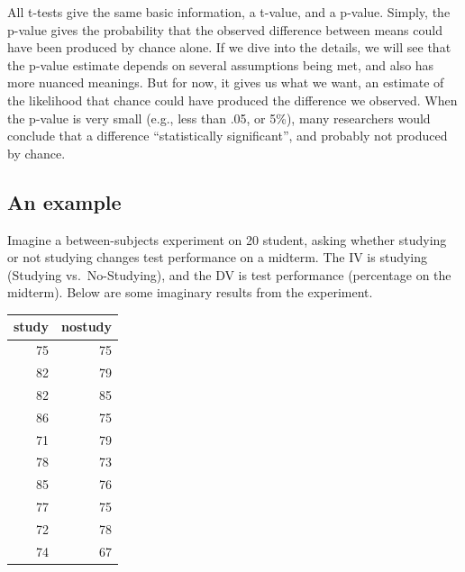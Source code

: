 All t-tests give the same basic information, a t-value, and a p-value.
Simply, the p-value gives the probability that the observed difference
between means could have been produced by chance alone. If we dive into
the details, we will see that the p-value estimate depends on several
assumptions being met, and also has more nuanced meanings. But for now,
it gives us what we want, an estimate of the likelihood that chance
could have produced the difference we observed. When the p-value is very
small (e.g., less than .05, or 5\%), many researchers would conclude
that a difference ``statistically significant'', and probably not
produced by chance.

\subsection{An example}\label{an-example}

Imagine a between-subjects experiment on 20 student, asking whether
studying or not studying changes test performance on a midterm. The IV
is studying (Studying vs.~No-Studying), and the DV is test performance
(percentage on the midterm). Below are some imaginary results from the
experiment.

\begin{longtable}[]{@{}rr@{}}
\toprule
study & nostudy\tabularnewline
\midrule
\endhead
75 & 75\tabularnewline
82 & 79\tabularnewline
82 & 85\tabularnewline
86 & 75\tabularnewline
71 & 79\tabularnewline
78 & 73\tabularnewline
85 & 76\tabularnewline
77 & 75\tabularnewline
72 & 78\tabularnewline
74 & 67\tabularnewline
\bottomrule
\end{longtable}




